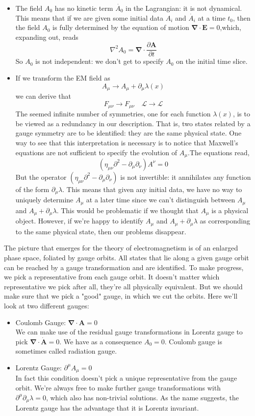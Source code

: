 \documentclass[cyan]{elegantnote}
\begin{document}
\begin{itemize}
\item The field $A_0$ has no kinetic term $\dot{A_0}$ in the Lagrangian: it is not dynamical. This means that if we are given some initial data $A_i$ and $\dot{A_i}$ at a time $t_0$, then the field $A_0$ is fully determined by the equation of motion $\bm{\nabla} \cdot \bm{E} = 0$,which, expanding out,
reads
\[\nabla^2 A_0 = \bm{\nabla} \cdot \frac{\partial \bm{A}}{\partial t}\]
So $A_0$ is not independent: we don't get to specify $A_0$ on the initial time slice.
\item If we transform the EM field as
\[A_{\mu} \to A_{\mu} + \partial_{\mu}\lambda(x) \]
we can derive that
\[F_{\mu\nu} \to F_{\mu \nu} \quad \mathcal{L} \to \mathcal{L}\]
The seemed infinite number of symmetries, one for each function $\lambda(x)$, is to be viewed as a redundancy in our description. That is, two states related by a gauge symmetry are to be identified: they are the same physical state. One way to see that this interpretation is necessary is to notice that Maxwell's equations are not sufficient to specify the evolution of $A_{\mu}$.The equations read,
\[(\eta_{\mu\nu} \partial^2 - \partial_{\mu} \partial_{\nu}) A^{\nu} = 0\]
But the operator $(\eta_{\mu\nu} \partial^2 - \partial_{\mu} \partial_{\nu})$ is not invertible: it annihilates any function of
the form $\partial_{\mu} \lambda$. This means that given any initial data, we have no way to uniquely determine $A_{\mu}$ at a later time since we can't distinguish between $A_{\mu}$ and $A_{\mu} + \partial_{\mu} \lambda$. This would be problematic if we thought that $A_{\mu}$ is a physical object. However, if we're happy to identify $A_{\mu}$ and $A_{\mu} + \partial_{\mu} \lambda$ as corresponding to the same physical state, then our problems disappear. 
\end{itemize}

\noindent
The picture that emerges for the theory of electromagnetism is of an enlarged phase space, foliated by gauge orbits. All states that lie along a given gauge orbit can be reached by a gauge transformation and are identified. To make progress, we pick a representative from each gauge orbit. It doesn't matter which representative we pick after all, they're all physically equivalent. But we should make sure that we pick a "good" gauge, in which we cut the orbits. Here we'll look at two different gauges:
\begin{itemize}
\item Coulomb Gauge: $\bm{\nabla} \cdot \bm{A} = 0$\\
We can make use of the residual gauge transformations in Lorentz gauge to pick $\bm{\nabla} \cdot \dot{\bm{A}} = 0$. We
have as a consequence $A_0 = 0$. Coulomb gauge is sometimes called radiation gauge.
\item Lorentz Gauge: $\partial^{\mu} A_{\mu} = 0$\\
In fact this condition doesn't pick a unique representative from the gauge orbit. We're always free to make further gauge transformations with $\partial^{\mu}\partial_{\mu} \lambda = 0$, which also has non-trivial solutions. As the name suggests, the Lorentz gauge has the advantage that it is Lorentz invariant.
\end{itemize}
\end{document}
